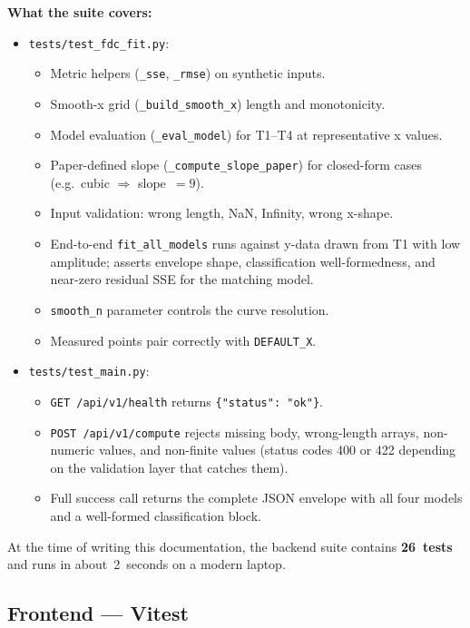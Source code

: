 \documentclass[11pt,a4paper]{article}
\begin{document}
\textbf{What the suite covers:}
\begin{itemize}[leftmargin=1.6em]
  \item \texttt{tests/test\_fdc\_fit.py}:
    \begin{itemize}[leftmargin=1.2em]
      \item Metric helpers (\texttt{\_sse}, \texttt{\_rmse}) on synthetic
            inputs.
      \item Smooth-x grid (\texttt{\_build\_smooth\_x}) length and
            monotonicity.
      \item Model evaluation (\texttt{\_eval\_model}) for T1--T4 at
            representative x values.
      \item Paper-defined slope (\texttt{\_compute\_slope\_paper}) for
            closed-form cases (e.g.\ cubic $\Rightarrow$ slope~$= 9$).
      \item Input validation: wrong length, NaN, Infinity, wrong x-shape.
      \item End-to-end \texttt{fit\_all\_models} runs against y-data drawn
            from T1 with low amplitude; asserts envelope shape, classification
            well-formedness, and near-zero residual SSE for the matching
            model.
      \item \texttt{smooth\_n} parameter controls the curve resolution.
      \item Measured points pair correctly with \texttt{DEFAULT\_X}.
    \end{itemize}
  \item \texttt{tests/test\_main.py}:
    \begin{itemize}[leftmargin=1.2em]
      \item \texttt{GET /api/v1/health} returns \texttt{\{"status": "ok"\}}.
      \item \texttt{POST /api/v1/compute} rejects missing body, wrong-length
            arrays, non-numeric values, and non-finite values (status codes
            400 or 422 depending on the validation layer that catches them).
      \item Full success call returns the complete JSON envelope with all
            four models and a well-formed classification block.
    \end{itemize}
\end{itemize}

At the time of writing this documentation, the backend suite contains
\textbf{26~tests} and runs in about~2~seconds on a modern laptop.

\subsection{Frontend --- Vitest}
\label{subsec:frontend_tests}
\end{document}
